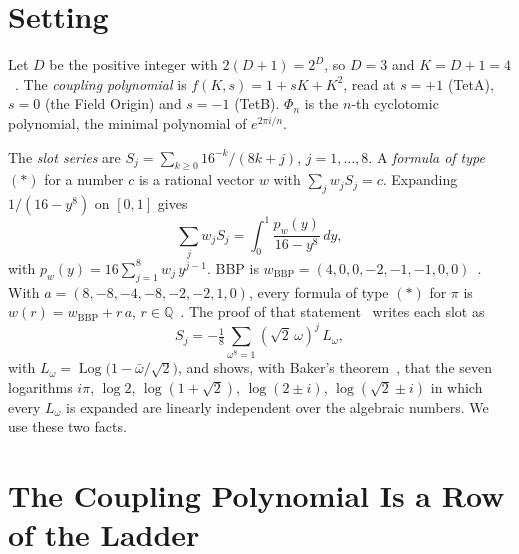 \documentclass[twocolumn]{iopjournal}
\begin{document}


\section*{Setting}

Let $D$ be the positive integer with $2(D+1) = 2^D$, so $D = 3$ and
$K = D + 1 = 4$~\cite{Nelson2026hadamard}. The \emph{coupling
polynomial} is $f(K,s) = 1 + sK + K^2$, read at $s = +1$ (TetA),
$s = 0$ (the Field Origin) and $s = -1$ (TetB). $\Phi_n$ is the
$n$-th cyclotomic polynomial, the minimal polynomial of
$e^{2\pi i/n}$.

The \emph{slot series} are
$S_j = \sum_{k \ge 0} 16^{-k}/(8k+j)$, $j = 1, \dots, 8$. A
\emph{formula of type $(\ast)$} for a number $c$ is a rational
vector $w$ with $\sum_j w_j S_j = c$. Expanding $1/(16 - y^8)$ on
$[0,1]$ gives
\begin{equation}
  \sum_j w_j S_j = \int_0^1 \frac{p_w(y)}{16 - y^8}\,dy,
  \label{eq:int}
\end{equation}
with $p_w(y) = 16\sum_{j=1}^{8} w_j\,y^{j-1}$.
BBP is $w_{\mathrm{BBP}} = (4,0,0,-2,-1,-1,0,0)$~\cite{BBP1997}.
With $a = (8,-8,-4,-8,-2,-2,1,0)$, every formula of type $(\ast)$
for $\pi$ is $w(r) = w_{\mathrm{BBP}} + r\,a$, $r \in
\mathbb{Q}$~\cite{AdamchikWagon1997,Nelson2026bbp}. The proof of
that statement~\cite{Nelson2026bbp} writes each slot as
\begin{equation}
  S_j = -\tfrac18\sum_{\omega^8 = 1} (\sqrt2\,\omega)^j\,L_\omega,
  \label{eq:res}
\end{equation}
with $L_\omega = \operatorname{Log}\big(1 - \bar\omega/\sqrt2\big)$,
and shows, with Baker's theorem~\cite{Baker1966}, that the seven
logarithms $i\pi$, $\log 2$, $\log(1+\sqrt2)$, $\log(2\pm i)$,
$\log(\sqrt2\pm i)$ in which every $L_\omega$ is expanded are
linearly independent over the algebraic numbers. We use these two
facts.


\section*{The Coupling Polynomial Is a Row of the Ladder}
\end{document}
